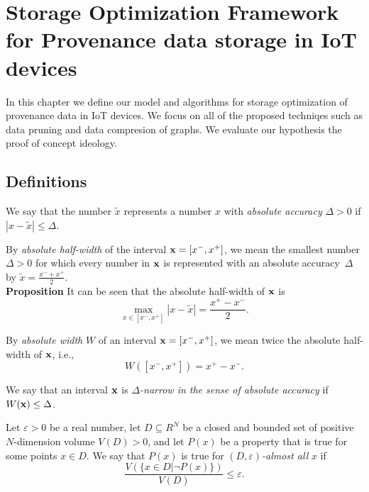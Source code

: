 
\chapter{Storage Optimization Framework for Provenance data storage in IoT devices} \label{MostNarrowEasy}

In this chapter we define our model and algorithms for storage optimization of provenance data in IoT devices. We focus on all of the proposed techniqes such as data pruning and data compresion of graphs.  We evaluate our hypothesis the proof of concept ideology.

\section{Definitions}

\begin{definition}
{\rm We say that the number $\tilde x$ represents a number $x$ with
{\em absolute accuracy\/} $\Delta>0$ if $|x-\tilde x|\leq\Delta$.}
\end{definition}

\begin{definition}
{\rm By {\em absolute half-width\/} of the interval ${\bf x}=[x^-,x^+]$, we
mean the smallest number $\Delta>0$ for which every number in ${\bf x}$ is
represented with an absolute accuracy~$\Delta$ by $\tilde x=\displaystyle{
\frac{x^-+x^+}{2}}$.\\[0.5pc]
{\bf Proposition} It can be seen that the absolute half-width of ${\bf x}$ is
$$
  \max_{x\in [x^-,x^+]} |x-\tilde x| = \frac{x^+-x^-}{2}.
$$}
\end{definition}

\begin{definition}
{\rm By {\em absolute width\/} $W$ of an interval ${\bf x}=[x^-,x^+]$, we mean
twice the absolute half-width of ${\bf x}$, i.e.,
$$
  W([x^-,x^+])=x^+-x^-.
$$}
\end{definition}

\begin{definition}
{\rm We say that an interval ${\bf x}$ is {\em $\Delta$-narrow in the sense
of absolute accuracy\/} if $W({\bf x})\leq\Delta$.}
\end{definition}

\begin{definition}
{\rm Let $\varepsilon>0$ be a real number, let $D\subseteq R^N$ be a closed
and bounded set of positive $N$-dimension volume $V(D)>0$, and let
$P(x)$ be a property that is true for some points $x\in D$.  We say that $P(x)$
is true for {\em $(D,\varepsilon)$-almost all\/} $x$ if}
$$
  \frac{V(\{x\in D|\neg P(x)\})}{V(D)}\leq \varepsilon.
$$
\end{definition}

